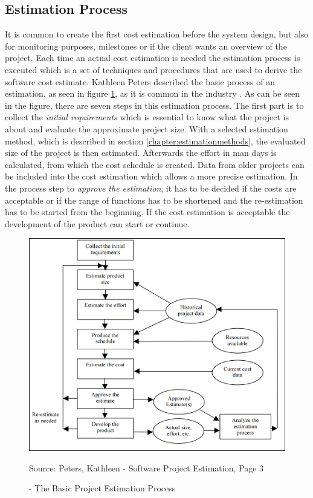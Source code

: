 \subsection{Estimation Process}

It is common to create the first cost estimation before the system design, but also for monitoring purposes, milestones or if the client wants an overview of the project. Each time an actual cost estimation is needed the estimation process is executed which is a set of techniques and procedures that are used to derive the software cost estimate. Kathleen Peters described the basic process of an estimation, as seen in figure \ref{fig:basicEstimationProcess}, as it is common in the industry \cite{estimationProcess}. As can be seen in the figure, there are seven steps in this estimation process. The first part is to collect the \textit{initial requirements} which is essential to know what the project is about and evaluate the approximate project size. With a selected estimation method, which is described in section \ref{chapter:estimationmethods}, the evaluated size of the project is then estimated. Afterwards the effort in man days is calculated, from which the cost schedule is created. Data from older projects can be included into the cost estimation which allows a more precise estimation. In the process step to \textit{approve the estimation}, it has to be decided if the costs are acceptable or if the range of functions has to be shortened and the re-estimation has to be started from the beginning. If the cost estimation is acceptable the development of the product can start or continue.\\
\begin{figure}[h] 
	\centering 
	\includegraphics[width=13cm]{images/estimationProcess.PNG} 
	\caption{- The Basic Project Estimation Process}
	Source: Peters, Kathleen - Software Project Estimation, Page 3  
	\label{fig:basicEstimationProcess}
\end{figure}\\
